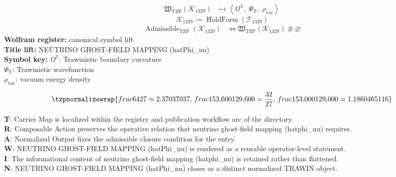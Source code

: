 \noindent
\begin{minipage}[t]{0.48\linewidth}
\begingroup
\small
\[
\begin{aligned}
\mathfrak{W}_{\mathrm{TZP}}\!\left(\mathcal{K}_{1329}\right)
&\longmapsto
\left\langle \Omega^{\mathbb{T}},\; \Psi_{\mathrm{T}},\; \rho_{\mathrm{vac}} \right\rangle
\end{aligned}
\]
\[
\mathcal{K}_{1329}
:=
\operatorname{HoldForm}\!\left(\mathcal{T}_{1329}\right)
\]
\[
\begin{aligned}
\operatorname{Admissible}_{\mathrm{TZP}}\!\left(\mathcal{K}_{1329}\right)
&\Longleftrightarrow
\mathfrak{W}_{\mathrm{TZP}}\!\left(\mathcal{K}_{1329}\right)\not\equiv\varnothing
\end{aligned}
\]
\textbf{Wolfram register:} canonical symbol lift\\
\textbf{Title lift:} NEUTRINO GHOST-FIELD MAPPING (hatPhi\_nu)\\
\textbf{Symbol key:} \(\Omega^{\mathbb{T}}\): Trawinistic boundary curvature\\ \(\Psi_{\mathrm{T}}\): Trawinistic wavefunction\\ \(\rho_{\mathrm{vac}}\): vacuum energy density
\par
\endgroup
\end{minipage}\hfill
\begin{minipage}[t]{0.48\linewidth}
\[
\tzpnormalizewrap{frac{64}{27} \approx 2.37037037,\,frac{153{,}600}{129{,}600} = \frac{32}{27},\,frac{153{,}000}{129{,}000} = 1.1860465116}
\]

\small
\textbf{T}: Carrier Map is localized within the registry and publication workflow arc of the directory.\\
\textbf{R}: Composable Action preserves the operative relation that neutrino ghost-field mapping (hatphi\_nu) requires.\\
\textbf{A}: Normalized Output fixes the admissible closure condition for the entry.\\
\textbf{W}: NEUTRINO GHOST-FIELD MAPPING (hatPhi\_nu) is rendered as a reusable operator-level statement.\\
\textbf{I}: The informational content of neutrino ghost-field mapping (hatphi\_nu) is retained rather than flattened.\\
\textbf{N}: NEUTRINO GHOST-FIELD MAPPING (hatPhi\_nu) closes as a distinct normalized TRAWIN object.
\normalsize
\end{minipage}

